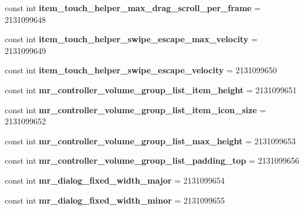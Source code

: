 \begin{DoxyCompactItemize}
const int {\bfseries item\+\_\+touch\+\_\+helper\+\_\+max\+\_\+drag\+\_\+scroll\+\_\+per\+\_\+frame} = 2131099648
\item 
\mbox{\label{classXaria_1_1Resource_1_1Dimension_a29c91c23cf14e9c93bf300191edbfc05}} 
const int {\bfseries item\+\_\+touch\+\_\+helper\+\_\+swipe\+\_\+escape\+\_\+max\+\_\+velocity} = 2131099649
\item 
\mbox{\label{classXaria_1_1Resource_1_1Dimension_a75080d922ebb84bde4c62dc48d5265e3}} 
const int {\bfseries item\+\_\+touch\+\_\+helper\+\_\+swipe\+\_\+escape\+\_\+velocity} = 2131099650
\item 
\mbox{\label{classXaria_1_1Resource_1_1Dimension_ad83e38dc8433e29442d0b019dd7546eb}} 
const int {\bfseries mr\+\_\+controller\+\_\+volume\+\_\+group\+\_\+list\+\_\+item\+\_\+height} = 2131099651
\item 
\mbox{\label{classXaria_1_1Resource_1_1Dimension_aade49e49ea8e88ec02a9bd54b532c210}} 
const int {\bfseries mr\+\_\+controller\+\_\+volume\+\_\+group\+\_\+list\+\_\+item\+\_\+icon\+\_\+size} = 2131099652
\item 
\mbox{\label{classXaria_1_1Resource_1_1Dimension_ab1d142355a003d3ff71f128702028eb7}} 
const int {\bfseries mr\+\_\+controller\+\_\+volume\+\_\+group\+\_\+list\+\_\+max\+\_\+height} = 2131099653
\item 
\mbox{\label{classXaria_1_1Resource_1_1Dimension_a4220c1fe173321e7ef83fabe78e6bb9b}} 
const int {\bfseries mr\+\_\+controller\+\_\+volume\+\_\+group\+\_\+list\+\_\+padding\+\_\+top} = 2131099656
\item 
\mbox{\label{classXaria_1_1Resource_1_1Dimension_a8051dce40001b5bd77001e23cf7a3269}} 
const int {\bfseries mr\+\_\+dialog\+\_\+fixed\+\_\+width\+\_\+major} = 2131099654
\item 
\mbox{\label{classXaria_1_1Resource_1_1Dimension_a3a8633fa81b68cf5d3c312d8bd140848}} 
const int {\bfseries mr\+\_\+dialog\+\_\+fixed\+\_\+width\+\_\+minor} = 2131099655

\end{DoxyCompactItemize}
